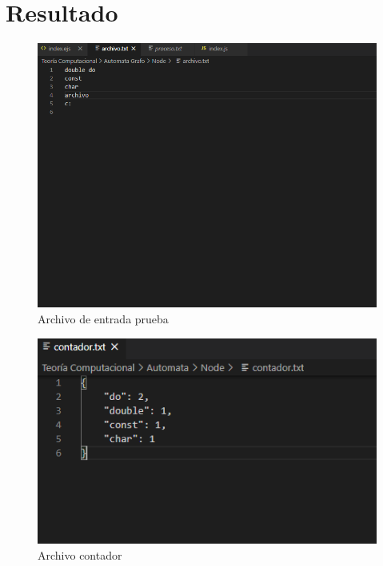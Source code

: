 \documentclass{article}
\begin{document}
	\section{Resultado}
		\begin{figure}[h]
    		\centering
    		\includegraphics[width=\textwidth]{archivo}
    		\caption{Archivo de entrada prueba}
		\end{figure}
		\begin{figure}[h]
    		\centering
    		\includegraphics[width=\textwidth]{contador}
    		\caption{Archivo contador}
		\end{figure}
\end{document}

